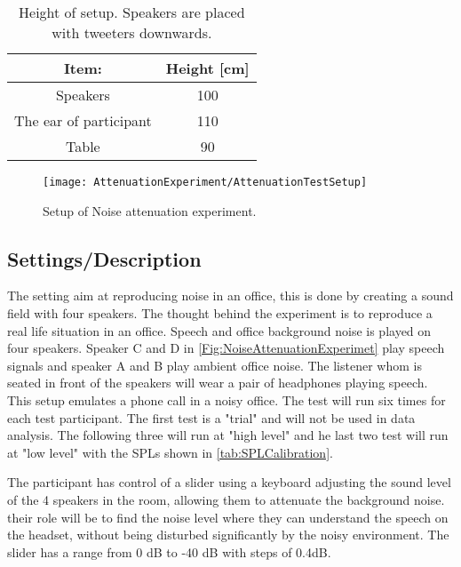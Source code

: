 \begin{table} [h]
	\centering
	\begin{tabular}{c c} \toprule
		\centering
		 Item:			 			& Height [cm] 	\\ \bottomrule
		Speakers					  	& 100				\\
		The ear of participant			& 110				\\ 
		Table							& 90				\\ \bottomrule 
	\end{tabular}
	\caption{Height of setup. Speakers are placed with tweeters downwards.}
	\label{Tab:NoiseAttenuationDimensions}
\end{table}


\begin{figure}[H]
	\centering
%	
	\texttt{[image: AttenuationExperiment/AttenuationTestSetup]}
	\caption{Setup of Noise attenuation experiment.}
	\label{Fig:NoiseAttenuationExperimet}
\end{figure}


\subsection{Settings/Description}
The setting aim at reproducing noise in an office, this is done by creating a sound field with four speakers. 
The thought behind the experiment is to reproduce a real life situation in an office. Speech and office background noise is played on four speakers. Speaker C and D in \autoref{Fig:NoiseAttenuationExperimet} play speech signals and speaker A and B play ambient office noise. The listener whom is seated in front of the speakers will wear a pair of headphones playing speech. This setup emulates a phone call in a noisy office. The test will run six times for each test participant. The first test is a "trial" and will not be used in data analysis. The following three will run at "high level" and he last two test will run at "low level" with the SPLs shown in \autoref{tab:SPLCalibration}. 

The participant has control of a slider using a keyboard adjusting the sound level of the 4 speakers in the room, allowing them to attenuate the background noise. their role will be to find the noise level where they can understand the speech on the headset, without being disturbed significantly by the noisy environment. The slider has a range from 0 dB to -40 dB with steps of 0.4dB. 

